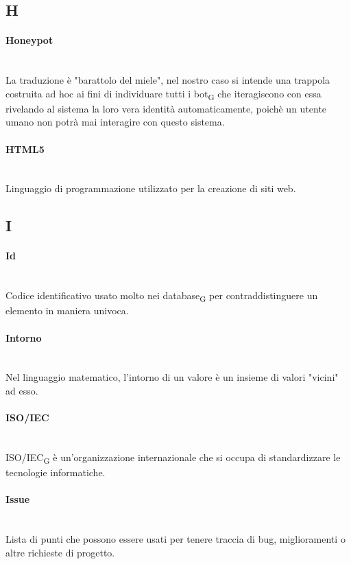 \subsection*{H}
\paragraph{Honeypot}~\smallskip \\
La traduzione è "barattolo del miele", nel nostro caso si intende una trappola costruita ad hoc ai fini di individuare tutti i bot\textsubscript{G} che iteragiscono con essa rivelando al sistema la loro vera identità automaticamente, poichè un utente umano non potrà mai interagire con questo sistema.

\paragraph{HTML5}~\smallskip \\
Linguaggio di programmazione utilizzato per la creazione di siti web.
\newpage
{}
\subsection*{I}
\paragraph{Id}~\smallskip \\
Codice identificativo usato molto nei database\textsubscript{G} per contraddistinguere un elemento in maniera univoca.

\paragraph{Intorno}~\smallskip \\
Nel linguaggio matematico, l'intorno di un valore è un insieme di valori "vicini" ad esso.

\paragraph{ISO/IEC}~\smallskip \\
ISO/IEC\textsubscript{G} è un'organizzazione internazionale che si occupa di standardizzare le tecnologie informatiche.

\paragraph{Issue}~\smallskip \\
Lista di punti che possono essere usati per tenere traccia di bug, miglioramenti o altre richieste di progetto.

